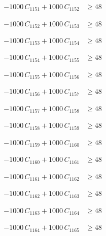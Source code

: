\documentclass[a4paper,11pt]{article}
\begin{document}
\begin{align}
-1000\,C_{1151} + 1000\,C_{1152} &\geq 48 \nonumber
\end{align}

\begin{align}
-1000\,C_{1152} + 1000\,C_{1153} &\geq 48 \nonumber
\end{align}

\begin{align}
-1000\,C_{1153} + 1000\,C_{1154} &\geq 48 \nonumber
\end{align}

\begin{align}
-1000\,C_{1154} + 1000\,C_{1155} &\geq 48 \nonumber
\end{align}

\begin{align}
-1000\,C_{1155} + 1000\,C_{1156} &\geq 48 \nonumber
\end{align}

\begin{align}
-1000\,C_{1156} + 1000\,C_{1157} &\geq 48 \nonumber
\end{align}

\begin{align}
-1000\,C_{1157} + 1000\,C_{1158} &\geq 48 \nonumber
\end{align}

\begin{align}
-1000\,C_{1158} + 1000\,C_{1159} &\geq 48 \nonumber
\end{align}

\begin{align}
-1000\,C_{1159} + 1000\,C_{1160} &\geq 48 \nonumber
\end{align}

\begin{align}
-1000\,C_{1160} + 1000\,C_{1161} &\geq 48 \nonumber
\end{align}

\begin{align}
-1000\,C_{1161} + 1000\,C_{1162} &\geq 48 \nonumber
\end{align}

\begin{align}
-1000\,C_{1162} + 1000\,C_{1163} &\geq 48 \nonumber
\end{align}

\begin{align}
-1000\,C_{1163} + 1000\,C_{1164} &\geq 48 \nonumber
\end{align}

\begin{align}
-1000\,C_{1164} + 1000\,C_{1165} &\geq 48 \nonumber
\end{align}
\end{document}
